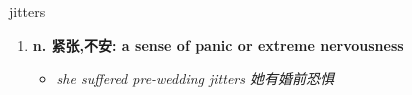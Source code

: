 
\begin{frame}
{\huge jitters}
\begin{center}
\begin{enumerate}\Large
  \item \textbf{n. 紧张,不安: a sense of panic or extreme nervousness}
  \begin{itemize}
    \item \em{\Large{she suffered pre-wedding jitters 她有婚前恐惧}}
  \end{itemize}
\end{enumerate}
\end{center}
\end{frame}
